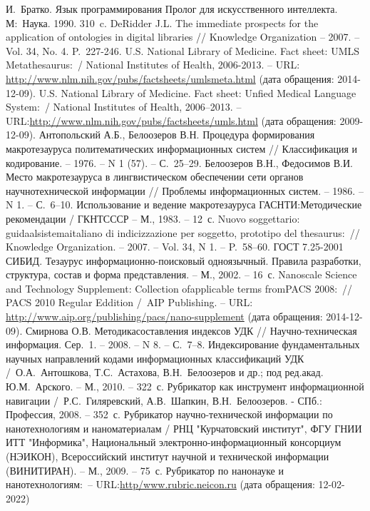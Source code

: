 \documentclass{studrep}
\begin{document}
\begin{thebibliography}{99}
 И.~Братко. Язык программирования Пролог для искусственного интеллекта. М\;:~Наука. 1990. 310~c.
 DeRidder J.L. The immediate prospects for the application of ontologies in digital libraries // Knowledge Organization -- 2007. -- Vol. 34, No. 4. P.~227-246.
  U.S. National Library of Medicine. Fact sheet: UMLS Metathesaurus\;:\;[текст]~/ National Institutes of Health, 2006-2013. -- URL:
\url{http://www.nlm.nih.gov/pubs/factsheets/umlsmeta.html} (дата обращения: 2014-12-09).
  U.S. National Library of Medicine. Fact sheet: Unfied Medical Language System\;:\;[текст]~/ National Institutes of Health, 2006--2013. -- URL:\url{http://www.nlm.nih.gov/pubs/factsheets/umls.html} (дата обращения: 2009-12-09).
  Антопольский А.Б., Белоозеров В.Н. Процедура формирования макротезауруса политематических информационных систем // Классификация и кодирование. -- 1976. -- N 1 (57). -- С.~25--29.
  Белоозеров В.Н., Федосимов В.И. Место макротезауруса в лингвистическом обеспечении сети органов научнотехнической информации // Проблемы информационных систем. -- 1986. -- N 1. -- С.~6--10.
  Использование и ведение макротезауруса ГАСНТИ:Методические рекомендации / ГКНТСССР -- М., 1983. -- 12~с.
  Nuovo soggettario: guidaalsistemaitaliano di indicizzazione per soggetto, prototipo del thesaurus\;:\;[рецензия]~// Knowledge Organization. -- 2007. -- Vol. 34, N 1. -- P.~58--60.
  ГОСТ 7.25-2001 СИБИД. Тезаурус информационно-поисковый одноязычный. Правила разработки, структура, состав и форма представления. -- М., 2002. -- 16~с.
  Nanoscale Science and Technology Supplement: Collection ofapplicable terms fromPACS 2008\;:\;[текст]~// PACS 2010 Regular Eddition /~AIP Publishing. -- URL: \url{http://www.aip.org/publishing/pacs/nano-supplement} (дата обращения: 2014-12-09).
  Смирнова О.В. Методикасоставления индексов УДК // Научно-техническая информация. Сер.~1. -- 2008. -- N 8. -- С.~7--8.
  Индексирование фундаментальных научных направлений кодами информационных классификаций УДК /~О.А.~Антошкова, Т.С.~Астахова, В.Н.~Белоозеров и др.; под ред.акад. Ю.М.~Арского. -- М., 2010. -- 322~с.
  Рубрикатор как инструмент информационной навигации /~Р.С.~Гиляревский, А.В.~Шапкин, В.Н.~Белоозеров. - СПб.\;: Профессия, 2008. -- 352~с.
  Рубрикатор научно-технической информации по нанотехнологиям и наноматериалам / РНЦ "Курчатовский институт",
ФГУ ГНИИ ИТТ "Информика", Национальный электронно-информационный консорциум (НЭИКОН), Всероссийский институт научной и технической информации (ВИНИТИРАН). -- М., 2009. -- 75~с.
  Рубрикатор по нанонауке и нанотехнологиям\;:\;[сайт]~-- URL:\url{http/www.rubric.neicon.ru} (дата обращения: 12-02-2022)
\end{thebibliography}
\end{document}
